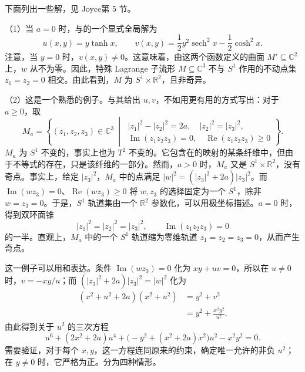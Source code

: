 下面列出一些解，见 Joyce第 5 节。
\begin{example}\label{ex:7.10}
\textup{（1）}当 $a=0$ 时，与的一个显式全局解为
\[
u(x,y)=y\tanh x,\qquad
v(x,y)=\frac12y^2\operatorname{sech}^2x-\frac12\cosh^2x.
\]
注意，当 $y=0$ 时，$v(x,y)\neq0$。这意味着，由这两个函数定义的曲面 $M'\subseteq\mathbb C^2$ 上，$w$ 从不为零。因此，特殊 Lagrange 子流形 $M\subseteq\mathbb C^3$ 不与 $S^1$ 作用的不动点集 $z_1=z_2=0$ 相交。由此看到，$M$ 为 $S^1\times\mathbb R^2$，且非奇异。

\textup{（2）}这是一个熟悉的例子。与其给出 $u,v$，不如用更有用的方式写出：对于 $a\geq0$，取
\[
M_a=\left\{(z_1,z_2,z_3)\in\mathbb C^3\ \middle|\
\begin{gathered}
|z_1|^2-|z_2|^2=2a,\quad |z_2|^2=|z_3|^2,\\
\operatorname{Im}(z_1z_2z_3)=0,\quad\operatorname{Re}(z_1z_2z_3)\geq0
\end{gathered}\right\}.
\]
$M_a$ 为 $S^1$ 不变的，事实上也为 $T^2$ 不变的。它包含在的映射的某条纤维中，但由于不等式的存在，只是该纤维的一部分。然而，$a>0$ 时，$M_a$ 又是 $S^1\times\mathbb R^2$，没有奇点。事实上，给定 $|z_3|^2$，$M_a$ 中的点满足 $|w|^2=(|z_3|^2+2a)|z_3|^2$。而 $\operatorname{Im}(wz_3)=0$、$\operatorname{Re}(wz_3)\geq0$ 将 $w,z_3$ 的选择固定为一个 $S^1$，除非 $w=z_3=0$。于是，$S^1$ 轨道集由一个 $\mathbb R^2$ 参数化，可以用极坐标描述。$a=0$ 时，得到双环面锥
\[
|z_1|^2=|z_2|^2=|z_3|^2,\qquad\operatorname{Im}(z_1z_2z_3)=0
\]
的一半。直观上，$M_a$ 中的一个 $S^1$ 轨道缩为零维轨道 $z_1=z_2=z_3=0$，从而产生奇点。

这一例子可以用和表达。条件 $\operatorname{Im}(wz_3)=0$ 化为 $xy+uv=0$，所以在 $u\neq0$ 时，$v=-xy/u$；而 $(|z_3|^2+2a)|z_3|^2=|w|^2$ 化为
\begin{equation}\label{eq:7.4}
\begin{aligned}
(x^2+u^2+2a)(x^2+u^2)
&=y^2+v^2\\
&=y^2+\frac{x^2y^2}{u^2}.
\end{aligned}
\end{equation}
由此得到关于 $u^2$ 的三次方程
\[
u^6+(2x^2+2a)u^4
\!+\bigl(-y^2+(x^2+2a)x^2\bigr)u^2-x^2y^2=0.
\]
需要验证，对于每个 $x,y$，这一方程连同原来的约束，确定唯一允许的非负 $u^2$；在 $y\neq0$ 时，它严格为正。分为四种情形。


\end{example}
